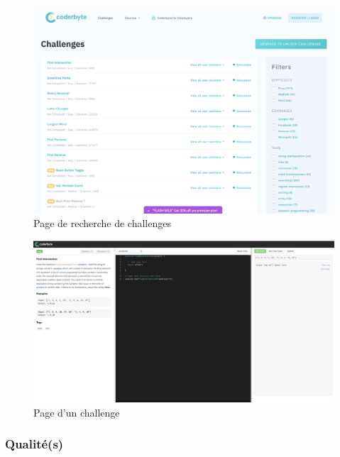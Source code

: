 \begin{figure}[H]
    \includegraphics[width=\textwidth,height=0.35\textheight,keepaspectratio]{images/comparison/coderbyte-1.png}
    \centering
    \caption[Coderbyte : page de recherche de challenges]{Page de recherche de challenges}
\end{figure}

\begin{figure}[H]
    \includegraphics[width=\textwidth,height=0.35\textheight,keepaspectratio]{images/comparison/coderbyte-2.png}
    \centering
    \caption[Coderbyte : page d'un challenge]{Page d'un challenge}
\end{figure}

\subsubsection*{Qualité(s)}

